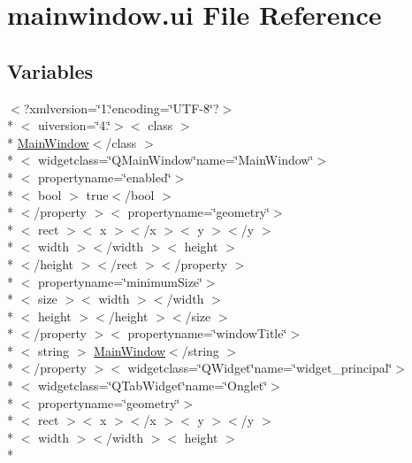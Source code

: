 \hypertarget{mainwindow_8ui}{\section{mainwindow.\-ui File Reference}
\label{mainwindow_8ui}
}
\subsection*{Variables}
\begin{DoxyCompactItemize}
\item 
$<$?xmlversion=\char`\"{}1.\char`\"{}encoding=\char`\"{}U\-T\-F-\/8\char`\"{}?$>$\\*
$<$ uiversion=\char`\"{}4.\char`\"{}$>$$<$ class $>$\\*
 \hyperlink{classMainWindow}{Main\-Window}$<$/class $>$\\*
$<$ widgetclass=\char`\"{}Q\-Main\-Window\char`\"{}name=\char`\"{}Main\-Window\char`\"{}$>$\\*
$<$ propertyname=\char`\"{}enabled\char`\"{}$>$\\*
$<$ bool $>$ true$<$/bool $>$\\*
$<$/property $>$$<$ propertyname=\char`\"{}geometry\char`\"{}$>$\\*
$<$ rect $>$$<$ x $>$$<$/x $>$$<$ y $>$$<$/y $>$\\*
$<$ width $>$$<$/width $>$$<$ height $>$\\*
$<$/height $>$$<$/rect $>$$<$/property $>$\\*
$<$ propertyname=\char`\"{}minimum\-Size\char`\"{}$>$\\*
$<$ size $>$$<$ width $>$$<$/width $>$\\*
$<$ height $>$$<$/height $>$$<$/size $>$\\*
$<$/property $>$$<$ propertyname=\char`\"{}window\-Title\char`\"{}$>$\\*
$<$ string $>$ \hyperlink{classMainWindow}{Main\-Window}$<$/string $>$\\*
$<$/property $>$$<$ widgetclass=\char`\"{}Q\-Widget\char`\"{}name=\char`\"{}widget\-\_\-principal\char`\"{}$>$\\*
$<$ widgetclass=\char`\"{}Q\-Tab\-Widget\char`\"{}name=\char`\"{}Onglet\char`\"{}$>$\\*
$<$ propertyname=\char`\"{}geometry\char`\"{}$>$\\*
$<$ rect $>$$<$ x $>$$<$/x $>$$<$ y $>$$<$/y $>$\\*
$<$ width $>$$<$/width $>$$<$ height $>$\\*

\end{DoxyCompactItemize}
